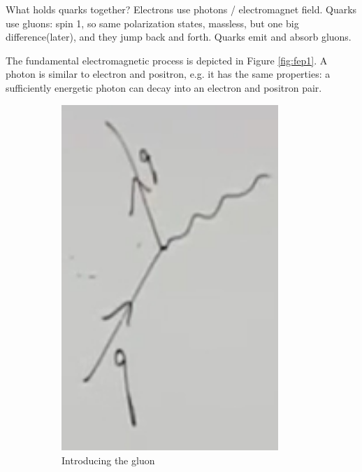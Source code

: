 \documentclass[]{article}
\begin{document}
What holds quarks together? Electrons use photons / electromagnet field. Quarks use gluons: spin 1, so same polarization states, massless, but one big difference(later), and they jump back and forth. Quarks emit and absorb gluons.

The fundamental electromagnetic process is depicted in Figure \ref{fig:fep1}. A photon is similar to electron and positron, e.g. it has the same properties: a sufficiently energetic photon can decay into an electron and positron pair.

\begin{figure}[H]
	\caption{Gluons}
	\begin{subfigure}[t]{0.45\textwidth}
		\caption{Introducing the gluon}\label{fig2-2-gluon1}
		\includegraphics[width=0.9\textwidth]{2-2-gluon1}
	\end{subfigure}
	\begin{subfigure}[t]{0.45\textwidth}

\end{subfigure}
\end{figure}
\end{document}
